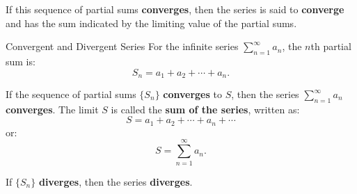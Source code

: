 \documentclass[12pt]{article}
\theoremstyle{beautifulthm}
\begin{document}
If this sequence of partial sums \textbf{converges}, then the series is said to \textbf{converge} and has the sum indicated by the limiting value of the partial sums.

\begin{Definition}{Convergent and Divergent Series}{}
For the infinite series $\sum_{n=1}^\infty a_n$, the $n$th partial sum is:
\[
S_n = a_1 + a_2 + \cdots + a_n.
\]

If the sequence of partial sums $\{S_n\}$ \textbf{converges} to $S$, then the series $\sum_{n=1}^\infty a_n$ \textbf{converges}. The limit $S$ is called the \textbf{sum of the series}, written as:
\[
S = a_1 + a_2 + \cdots + a_n + \cdots
\]
or:
\[
S = \sum_{n=1}^\infty a_n.
\]

If $\{S_n\}$ \textbf{diverges}, then the series \textbf{diverges}.
\end{Definition}
\end{document}
